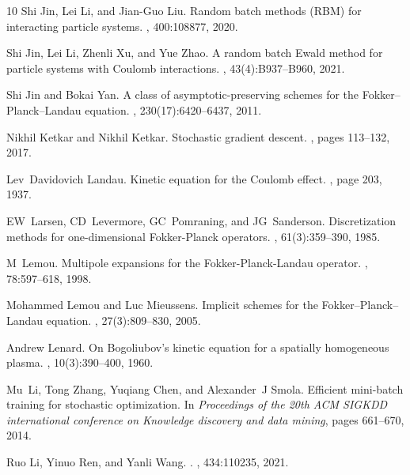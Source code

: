 \documentclass[preprint,1p,times]{elsarticle}
\theoremstyle{definition}
\theoremstyle{remark}
\begin{document}
\begin{thebibliography}{10}
Shi Jin, Lei Li, and Jian-Guo Liu.
\newblock Random batch methods ({RBM}) for interacting particle systems.
, 400:108877, 2020.

Shi Jin, Lei Li, Zhenli Xu, and Yue Zhao.
\newblock A random batch {E}wald method for particle systems with {C}oulomb
  interactions.
, 43(4):B937--B960, 2021.

Shi Jin and Bokai Yan.
\newblock A class of asymptotic-preserving schemes for the
  {F}okker--{P}lanck--{L}andau equation.
, 230(17):6420--6437, 2011.

Nikhil Ketkar and Nikhil Ketkar.
\newblock Stochastic gradient descent.
, pages
  113--132, 2017.

Lev~Davidovich Landau.
\newblock Kinetic equation for the {C}oulomb effect.
, page 203, 1937.

EW~Larsen, CD~Levermore, GC~Pomraning, and JG~Sanderson.
\newblock Discretization methods for one-dimensional {F}okker-{P}lanck
  operators.
, 61(3):359--390, 1985.

M~Lemou.
\newblock Multipole expansions for the {F}okker-{P}lanck-{L}andau operator.
, 78:597--618, 1998.

Mohammed Lemou and Luc Mieussens.
\newblock Implicit schemes for the {F}okker--{P}lanck--{L}andau equation.
, 27(3):809--830, 2005.

Andrew Lenard.
\newblock On {B}ogoliubov's kinetic equation for a spatially homogeneous
  plasma.
, 10(3):390--400, 1960.

Mu~Li, Tong Zhang, Yuqiang Chen, and Alexander~J Smola.
\newblock Efficient mini-batch training for stochastic optimization.
\newblock In {\em Proceedings of the 20th ACM SIGKDD international conference
  on Knowledge discovery and data mining}, pages 661--670, 2014.

Ruo Li, Yinuo Ren, and Yanli Wang.
.
, 434:110235, 2021.


\end{thebibliography}
\end{document}
